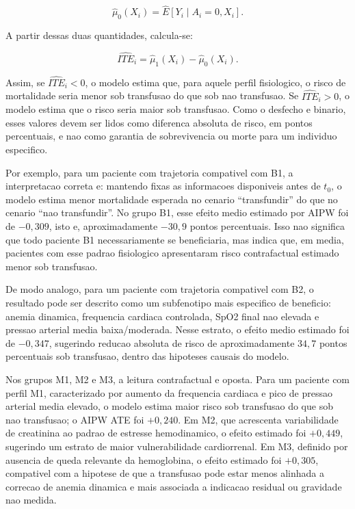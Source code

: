 \[
\hat\mu_0(X_i) = \widehat{E}[Y_i \mid A_i=0, X_i].
\]

A partir dessas duas quantidades, calcula-se:

\[
\widehat{ITE}_i = \hat\mu_1(X_i)-\hat\mu_0(X_i).
\]

Assim, se $\widehat{ITE}_i<0$, o modelo estima que, para aquele perfil fisiologico, o risco de mortalidade seria menor sob transfusao do que sob nao transfusao. Se $\widehat{ITE}_i>0$, o modelo estima que o risco seria maior sob transfusao. Como o desfecho e binario, esses valores devem ser lidos como diferenca absoluta de risco, em pontos percentuais, e nao como garantia de sobrevivencia ou morte para um individuo especifico.

Por exemplo, para um paciente com trajetoria compativel com B1, a interpretacao correta e: mantendo fixas as informacoes disponiveis antes de $t_0$, o modelo estima menor mortalidade esperada no cenario ``transfundir'' do que no cenario ``nao transfundir''. No grupo B1, esse efeito medio estimado por AIPW foi de $-0{,}309$, isto e, aproximadamente $-30{,}9$ pontos percentuais. Isso nao significa que todo paciente B1 necessariamente se beneficiaria, mas indica que, em media, pacientes com esse padrao fisiologico apresentaram risco contrafactual estimado menor sob transfusao.

De modo analogo, para um paciente com trajetoria compativel com B2, o resultado pode ser descrito como um subfenotipo mais especifico de beneficio: anemia dinamica, frequencia cardiaca controlada, SpO2 final nao elevada e pressao arterial media baixa/moderada. Nesse estrato, o efeito medio estimado foi de $-0{,}347$, sugerindo reducao absoluta de risco de aproximadamente $34{,}7$ pontos percentuais sob transfusao, dentro das hipoteses causais do modelo.

Nos grupos M1, M2 e M3, a leitura contrafactual e oposta. Para um paciente com perfil M1, caracterizado por aumento da frequencia cardiaca e pico de pressao arterial media elevado, o modelo estima maior risco sob transfusao do que sob nao transfusao; o AIPW ATE foi $+0{,}240$. Em M2, que acrescenta variabilidade de creatinina ao padrao de estresse hemodinamico, o efeito estimado foi $+0{,}449$, sugerindo um estrato de maior vulnerabilidade cardiorrenal. Em M3, definido por ausencia de queda relevante da hemoglobina, o efeito estimado foi $+0{,}305$, compativel com a hipotese de que a transfusao pode estar menos alinhada a correcao de anemia dinamica e mais associada a indicacao residual ou gravidade nao medida.

